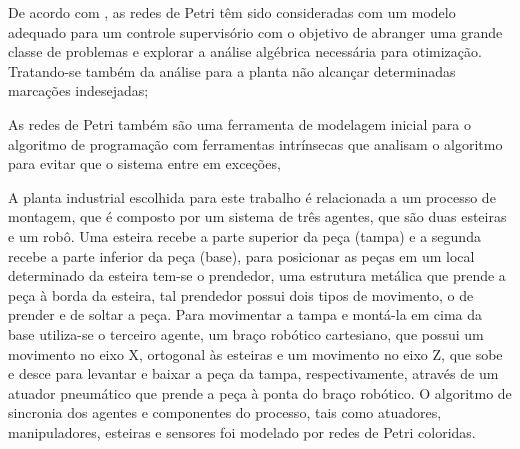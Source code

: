 De acordo com\cite{discrete}
, as redes de Petri têm sido consideradas com um modelo adequado para um controle supervisório com o objetivo de abranger uma grande classe de problemas e explorar a análise algébrica necessária para otimização. Tratando-se também da análise para a planta não alcançar determinadas marcações indesejadas;

As redes de Petri também são uma ferramenta de modelagem inicial para o algoritmo de programação com ferramentas intrínsecas que analisam o algoritmo para evitar que o sistema entre em exceções,\cite{embeddedOO}


A planta industrial escolhida para este trabalho é relacionada a um processo de montagem, que é composto por um sistema de três agentes, que são duas esteiras e um robô. Uma esteira recebe a parte superior da peça (tampa) e a segunda recebe a parte inferior da peça (base), para posicionar as peças em um local determinado da esteira tem-se o prendedor, uma estrutura metálica que prende a peça à borda da esteira, tal prendedor possui dois tipos de movimento, o de prender e de soltar a peça. Para movimentar a tampa e montá-la em cima da base utiliza-se  o terceiro agente, um braço robótico cartesiano, que possui um movimento no eixo X, ortogonal às esteiras e um movimento no eixo Z, que sobe e desce para levantar e baixar a peça da tampa, respectivamente, através de um atuador pneumático que prende a peça à ponta do braço robótico. O algoritmo de sincronia dos agentes e componentes do processo, tais como atuadores, manipuladores, esteiras e sensores foi modelado por redes de Petri coloridas.


